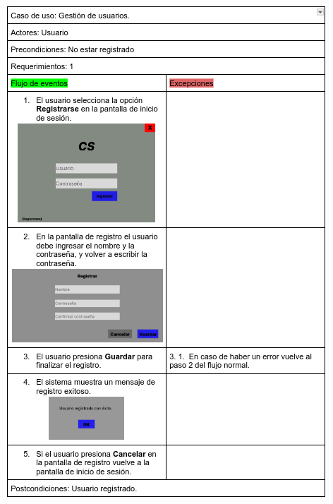 \documentclass{article}
\begin{document}
	\includegraphics[width=1\linewidth]{imagenes/especificacion_usuario.png}
	
\end{document}
